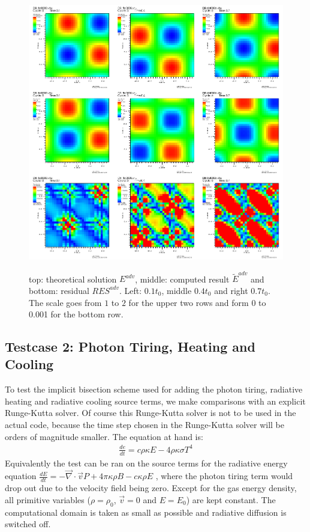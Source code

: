 \begin{figure}
\includegraphics[width = \textwidth]{visit0002.png}
\label{fig: test_advection}
\caption{top: theoretical solution $E^{adv}$, middle: computed result $\tilde{E}^{adv}$ and bottom: residual $RES^{adv}$. Left: $0.1 t_0$, middle $0.4 t_0$ and right $0.7 t_0$. The scale goes from $1$ to $2$ for the upper two rows and form 0 to 0.001 for the bottom row.}
\end{figure}



\subsection{Testcase 2: Photon Tiring, Heating and Cooling}
To test the implicit bisection scheme used for adding the photon tiring, radiative heating and radiative cooling source terms, we make comparisons with an explicit Runge-Kutta solver. Of course this Runge-Kutta solver is not to be used in the actual code, because the time step chosen in the Runge-Kutta solver will be orders of magnitude smaller. The equation at hand is:
\begin{align}
\frac{d e}{dt} = c \rho \kappa E - 4 \rho \kappa \sigma T^4
\end{align}
Equivalently the test can be ran on the source terms for the radiative energy equation $\frac{dE}{dt} = - \vec{\nabla} \cdot \vec{v} P + 4\pi \kappa\rho B - c \kappa \rho E$ , where the photon tiring term would drop out due to the velocity field being zero.
Except for the gas energy density, all primitive variables ($\rho = \rho_0$, $\vec{v} = 0$ and $E = E_0$) are kept constant. The computational domain is taken as small as possible and radiative diffusion is switched off. \\

